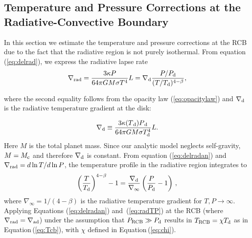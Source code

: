 \documentclass[apj, numberedappendix]{emulateapj}
\newcommand{\Eq}[1]{Equation\,(\ref{#1})}
\newcommand{\Eqs}[2]{Equations (\ref{#1}) and~(\ref{#2})}
\newcommand{\delad}{\nabla_{\rm ad}}
\newcommand{\delrad}{\nabla_{\rm rad}}
\newcommand{\co}{_{\rm c}}
\newcommand{\di}{_{\rm d}}
\newcommand{\cb}{_{\rm RCB}}
\begin{document}
\subsection{Temperature and Pressure Corrections at the Radiative-Convective Boundary}
\label{RCBcorr}

In this section we estimate the temperature and pressure corrections at the RCB due to the fact that the radiative region is not purely isothermal. From equation (\ref{eq:delrad}), we express the radiative lapse rate
\begin{equation}\label{eq:delradan}
\delrad = {3 \kappa P \over 64 \pi  G M \sigma T^4} L = \nabla\di {P/P_{\rm d} \over (T/T_{\rm d})^{4-\beta}},
\end{equation}

\noindent where the second equality follows from the opacity law (\ref{eq:opacitylaw}) and $\nabla_{\rm d}$ is the radiative temperature gradient at the disk:

\begin{equation}
\label{eq:delo}
\nabla \di \equiv \frac{3 \kappa(T{\di}) P{\di}}{64 \pi G M \sigma T_{\rm d}^4} L.
\end{equation}
Here $M$ is the total planet mass. Since our analytic model neglects self-gravity, $M=M\co$ and therefore $\nabla\di$ is constant. From equation (\ref{eq:delradan}) and $\delrad=d \ln T / d\ln P$, the temperature profile in the radiative region integrates to
\begin{equation}\label{eq:radTP}
\left(T \over T_{\rm d}\right)^{4-\beta} - 1 = {\nabla\di \over \nabla_\infty} \left( {P \over P_{\rm d}} - 1 \right) \, ,
\end{equation} 
where $\nabla_\infty = 1/(4-\beta)$ is the radiative temperature gradient for $T ,P \rightarrow \infty$.
Applying \Eqs{eq:delradan}{eq:radTP} at the RCB (where $\delrad = \delad$) under the assumption that $P\cb \gg P_{\rm d}$ results in  $T\cb=\chi T\di$ as in \Eq{eq:Tcb}, with $\chi$ defined in \Eq{eq:chi}.
\end{document}
